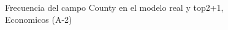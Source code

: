 \begin{figure}[H]
    \centering
    
    \caption{Frecuencia del campo County en el modelo real y top2+1, Economicos (A-2)}
    \label{frecuency-County-top2+1}
\end{figure}